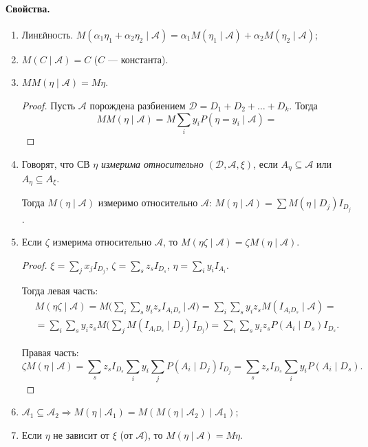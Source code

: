 \paragraph{Свойства.}
\begin{enumerate}
  \item \textsc{Линейность}. $M(\alpha_1 \eta_1 + \alpha_2 \eta_2 \mid \mathscr{A}) =
      \alpha_1 M(\eta_1 \mid \mathscr{A}) + \alpha_2 M(\eta_2 \mid \mathscr{A})$;
  \item $M(C \mid \mathscr{A}) = C$ ($ C $ --- константа).
  \item $MM(\eta\mid  \mathscr{A}) = M\eta$.
    \begin{proof}
      Пусть $\mathscr{A}$ порождена разбиением $\mathscr{D} = D_1 + D_2 + \dots
      + D_k$. Тогда
      \[
        MM(\eta \mid  \mathscr{A}) = M \sum_i y_i P(\eta = y_i \mid  \mathscr{A}) =
      \]
    \end{proof}

  \item \begin{definition}
      Говорят, что СВ $\eta$ \emph{измерима относительно $(\mathscr{D},
      \mathscr{A}, \xi)$}, если
      $A_{\eta} \subseteq \mathscr{A}$ или $A_\eta \subseteq A_\xi$.
    \end{definition}

    Тогда $M(\eta \mid  \mathscr{A})$ измеримо относительно $\mathscr{A}$:
      $M(\eta \mid  \mathscr{A}) = \sum M(\eta \mid  D_j) I_{D_j}$.

    \item Если $\zeta$ измерима относительно $\mathscr{A}$, то $M(\eta \zeta
      \mid  \mathscr{A}) = \zeta M(\eta \mid  \mathscr{A})$.
    \begin{proof}
      $\xi = \sum_j x_j I_{D_j}$, $\zeta = \sum_s z_s I_{D_s}$, $\eta = \sum_i y_i I_{A_i}$.

      Тогда левая часть:
      \begin{multline*}
        M(\eta\zeta \mid  \mathscr{A}) = M \bigg( \sum_i \sum_s y_i z_s I_{A_i
        D_s} \, \Big| \,  \mathscr{A} \bigg)
        = \sum_i \sum_s y_i z_s M ( I_{A_i D_s} \mid  \mathscr{A} ) = \\
        = \sum_i \sum_s y_i z_s M \bigg( \sum_j M(I_{A_i D_s} \mid  D_j) I_{D_j}
          \bigg) 
        = \sum_i \sum_s y_i z_s P(A_i \mid  D_s) I_{D_s}.
      \end{multline*}

      Правая часть:
      \[
        \zeta M(\eta \mid  \mathscr{A}) = \sum_s z_s I_{D_s} \sum_i y_i \sum_j
        P(A_i \mid  D_j) I_{D_j}
        = \sum_s z_s I_{D_s} \sum_i y_i P(A_i \mid  D_s).
      \]
    \end{proof}

  \item $\mathscr{A}_1 \subseteq \mathscr{A}_2 \Rightarrow M(\eta \mid
    \mathscr{A}_1) = M( M(\eta \mid  \mathscr{A}_2) \mid  \mathscr{A}_1)$;

  \item Если $\eta$ не зависит от $\xi$ (от $\mathscr{A}$), то $M(\eta \mid  \mathscr{A}) = M\eta$.
\end{enumerate}

